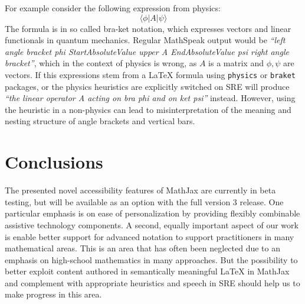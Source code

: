 \documentclass{sig-alternate}
\begin{document}
For example consider the following expression from physics:
\[\langle \phi |A|\psi \rangle\]
The formula is in so called bra-ket notation, which expresses vectors and linear
functionals in quantum mechanics. Regular MathSpeak output would be \emph{``left
  angle bracket phi StartAbsoluteValue upper A EndAbsoluteValue psi right angle
  bracket''}, which in the context of physics is wrong, as $A$ is a matrix and
$\phi,\psi$ are vectors. If this expressions stem from a {\LaTeX} formula using
\texttt{physics} or \texttt{braket} packages, or the physics heuristics are
explicitly switched on SRE will produce \emph{``the linear operator A acting on
  bra phi and on ket psi''} instead. However, using the heuristic in a
non-physics can lead to misinterpretation of the meaning and nesting structure
of angle brackets and vertical bars.








\section{Conclusions}
\label{sec:conc}

The presented novel accessibility features of MathJax are currently in beta
testing, but will be available as an option with the full version 3 release. One
particular emphasis is on ease of personalization by providing flexibly
combinable assistive technology components. A second, equally important aspect
of our work is enable better support for advanced notation to support
practitioners in many mathematical areas. This is an area that has often been
neglected due to an emphasis on high-school mathematics in many approaches. But
the possibility to better exploit content authored in semantically meaningful
{\LaTeX} in MathJax and complement with appropriate heuristics and speech in SRE
should help us to make progress in this area.
\end{document}
